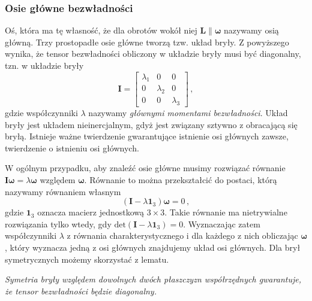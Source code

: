 \documentclass[../main.tex]{subfiles}
\begin{document}
\subsubsection{Osie główne bezwładności}
Oś, która ma tę własność, że dla obrotów wokół niej \(\mathbf{L}\parallel\boldsymbol{\omega}\)
nazywamy osią główną. Trzy prostopadłe osie główne tworzą tzw. układ bryły. Z powyższego wynika, że
tensor bezwładności obliczony w układzie bryły musi być diagonalny, tzn. w układzie bryły
\begin{equation*}
    \mathbf{I}=\begin{bmatrix}\lambda_1&0&0\\0&\lambda_2&0\\0&0&\lambda_3 \end{bmatrix}\,,
\end{equation*}
gdzie współczynniki \(\lambda\) nazywamy \textit{głównymi momentami bezwładności}. Układ bryły jest
układem nieinercjalnym, gdyż jest związany sztywno z obracającą się bryłą. Istnieje ważne
twierdzenie gwarantujące istnienie osi głównych zawsze, twierdzenie o istnieniu osi głównych.
\medskip

\noindent{}
\medskip

W ogólnym przypadku, aby znaleźć osie główne musimy rozwiązać równanie
\(\mathbf{I}\boldsymbol{\omega}=\lambda\boldsymbol{\omega}\) względem \(\boldsymbol{\omega}\).
Równanie to można przekształcić do postaci, którą nazywamy równaniem własnym
\begin{equation*}
    (\mathbf{I}-\lambda\mathbf{1}_3)\boldsymbol{\omega}=0\,,
\end{equation*}
gdzie \(\mathbf{1}_3\) oznacza macierz jednostkową \(3\times3\). Takie równanie ma nietrywialne
rozwiązania tylko wtedy, gdy \(\text{det}(\mathbf{I}-\lambda\mathbf{1}_3)=0\). Wyznaczając zatem
współczynniki \(\lambda\) z równania charakterystycznego i dla każdego z nich obliczając
\(\boldsymbol{\omega}\), który wyznacza jedną z osi głównych znajdujemy układ osi głównych. Dla brył
symetrycznych możemy skorzystać z lematu.
\medskip

\textit{Symetria bryły względem dowolnych dwóch płaszczyzn współrzędnych gwarantuje, że tensor bezwładności będzie diagonalny.}
\end{document}
